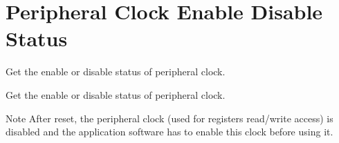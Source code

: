 \hypertarget{group___r_c_c_ex___peripheral___clock___enable___disable___status}{}\section{Peripheral Clock Enable Disable Status}
\label{group___r_c_c_ex___peripheral___clock___enable___disable___status}


Get the enable or disable status of peripheral clock.  


Get the enable or disable status of peripheral clock. 

\begin{DoxyNote}{Note}
After reset, the peripheral clock (used for registers read/write access) is disabled and the application software has to enable this clock before using it. 
\end{DoxyNote}
